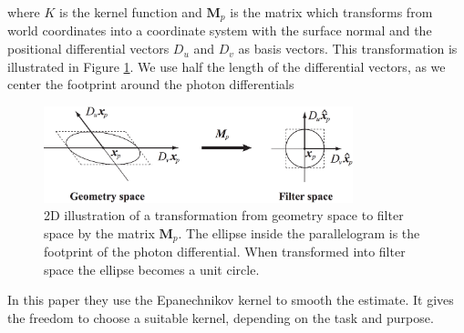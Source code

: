 where $K$ is the kernel function and $\mathbf{M}_p$ is the matrix which transforms from world coordinates into a coordinate system with the surface normal and the positional differential vectors $D_u$ and $D_v$ as basis vectors. This transformation is illustrated in Figure \ref{f:photon-matrix}. We use half the length of the differential vectors, as we center the footprint around the photon differentials

\begin{figure}\label{f:photon-matrix}
\begin{center}
	\includegraphics[width=0.8\textwidth]{graphics/pm/pm-13-9}
\end{center}
	\caption{2D illustration of a transformation from geometry space to filter space by the matrix $\mathbf{M}_p$. The ellipse inside the parallelogram is the footprint of the photon differential. When transformed into filter space the ellipse becomes a unit circle.}
\end{figure}

In this paper they use the Epanechnikov kernel to smooth the estimate. It gives the freedom to choose a suitable kernel, depending on the task and purpose.

